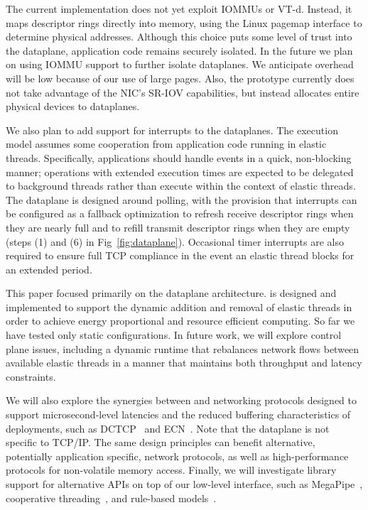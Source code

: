  The current \ix
implementation does not yet exploit IOMMUs or VT-d. Instead, it maps
descriptor rings directly into \ix memory, using the Linux pagemap
interface to determine physical addresses.  Although this choice puts
some level of trust into the \ix dataplane, application code remains
securely isolated. In the future we plan on using IOMMU support to
further isolate \ix dataplanes. We anticipate overhead will be low
because of our use of large pages.  Also, the \ix prototype currently
does not take advantage of the NIC's SR-IOV capabilities, but instead
allocates entire physical devices to dataplanes.

We also plan to add support for interrupts to the \ix dataplanes. The
\ix execution model assumes some cooperation from application code
running in elastic threads.  Specifically, applications should handle
events in a quick, non-blocking manner; operations with extended
execution times are expected to be delegated to background threads
rather than execute within the context of elastic threads.  The \ix
dataplane is designed around polling, with the provision that
interrupts can be configured as a fallback optimization to refresh
receive descriptor rings when they are nearly full and to refill
transmit descriptor rings when they are empty (steps (1) and (6) in
Fig~\ref{fig:dataplane}). Occasional timer interrupts are also
required to ensure full TCP compliance in the event an elastic thread
blocks for an extended period.

 This paper focused primarily on the \ix
dataplane architecture. \ix is designed and implemented to support the
dynamic addition and removal of elastic threads in order to achieve
energy proportional and resource efficient computing. So far we have
tested only static configurations. In future work, we will explore
control plane issues, including a dynamic runtime that rebalances
network flows between available elastic threads in a manner that
maintains both throughput and latency constraints.

We will also explore the synergies between \ix and networking
protocols designed to support microsecond-level latencies and the
reduced buffering characteristics of \ix deployments, such as
DCTCP~\cite{DBLP:conf/sigcomm/AlizadehGMPPPSS10} and
ECN~\cite{ramakrishnan2001addition}. Note that the \ix dataplane is
not specific to TCP/IP. The same design principles can benefit
alternative, potentially application specific, network protocols, as
well as high-performance protocols for non-volatile memory
access. Finally, we will investigate library support for alternative
APIs on top of our low-level interface, such as
MegaPipe~\cite{DBLP:conf/osdi/HanMCR12}, cooperative
threading~\cite{DBLP:conf/sosp/BehrenCZNB03}, and rule-based
models~\cite{DBLP:conf/hotos/StutsmanO13}.

